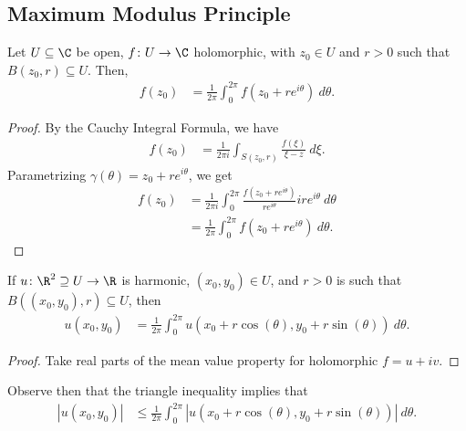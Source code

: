 \documentclass[10pt]{mypackage}
\begin{document}
\subsection{Maximum Modulus Principle}%
\begin{theorem}
  Let $U\subseteq \C$ be open, $f\colon U\rightarrow \C$ holomorphic, with $z_0\in U$ and $r > 0$ such that $B\left( z_0,r \right)\subseteq U$. Then,
  \begin{align*}
    f\left( z_0 \right) &= \frac{1}{2\pi} \int_{0}^{2\pi} f\left( z_0 + re^{i\theta} \right)\:d\theta.
  \end{align*}
\end{theorem}
\begin{proof}
  By the Cauchy Integral Formula, we have
  \begin{align*}
    f\left( z_0 \right) &= \frac{1}{2\pi i} \int_{S\left( z_0,r \right)}^{} \frac{f\left( \xi \right)}{\xi - z}\:d\xi.
  \end{align*}
  Parametrizing $\gamma\left( \theta \right) = z_0 + re^{i\theta}$, we get
  \begin{align*}
    f\left( z_0 \right) &= \frac{1}{2\pi i} \int_{0}^{2\pi} \frac{f\left( z_0 + re^{i\theta} \right)}{re^{i\theta}}ire^{i\theta}\:d\theta\\
                        &= \frac{1}{2\pi} \int_{0}^{2\pi} f\left( z_0 + re^{i\theta} \right)\:d\theta.
  \end{align*}
\end{proof}
\begin{corollary}
  If $u\colon \R^{2}\supseteq U\rightarrow \R$ is harmonic, $\left( x_0,y_0 \right)\in U$, and $r > 0$ is such that $B\left( \left( x_0,y_0 \right),r \right)\subseteq U$, then
  \begin{align*}
    u\left( x_0,y_0 \right) &= \frac{1}{2\pi} \int_{0}^{2\pi} u\left( x_0 + r\cos\left( \theta \right),y_0 + r\sin\left( \theta \right) \right)\:d\theta.
  \end{align*}
\end{corollary}
\begin{proof}
  Take real parts of the mean value property for holomorphic $f = u + iv$.
\end{proof}
Observe then that the triangle inequality implies that
\begin{align*}
  \left\vert u\left( x_0,y_0 \right) \right\vert &\leq \frac{1}{2\pi} \int_{0}^{2\pi} \left\vert u\left( x_0 + r\cos\left( \theta \right),y_0 + r\sin\left( \theta \right) \right) \right\vert\:d\theta.
\end{align*}
\end{document}
